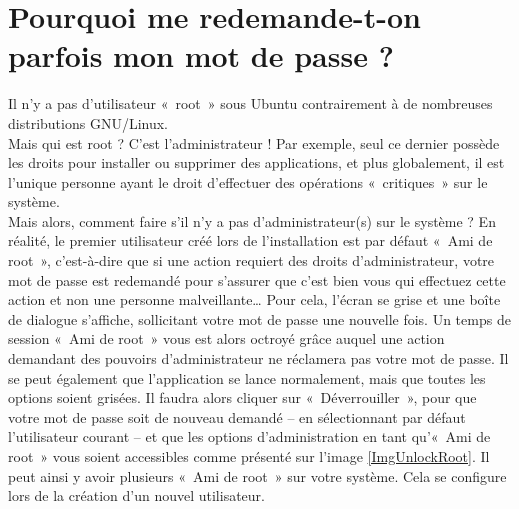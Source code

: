 \section{Pourquoi me redemande-t-on parfois mon mot de passe ?}
\label{RefMdpRoot}
Il n'y a pas d'utilisateur «~root~» sous Ubuntu contrairement à de nombreuses distributions GNU/Linux.\\
Mais qui est root ? C'est l'administrateur ! Par exemple, seul ce dernier possède les droits pour installer ou supprimer des applications, et plus globalement, il est l'unique personne ayant le droit d'effectuer des opérations «~critiques~» sur le système.\\
Mais alors, comment faire s'il n'y a pas d'administrateur(s) sur le système ? En réalité, le premier utilisateur créé lors de l'installation est par défaut «~Ami de root~», c'est-à-dire que si une action requiert des droits d'administrateur, votre mot de passe est redemandé pour s'assurer que c'est bien vous qui effectuez cette action et non une personne malveillante\ldots{} Pour cela, l'écran se grise et une boîte de dialogue s'affiche, sollicitant votre mot de passe une nouvelle fois. Un temps de session «~Ami de root~» vous est alors octroyé grâce auquel une action demandant des pouvoirs d'administrateur ne réclamera pas votre mot de passe. Il se peut également que l'application se lance normalement, mais que toutes les options soient grisées. Il faudra alors cliquer sur «~Déverrouiller~», pour que votre mot de passe soit de nouveau demandé -- en sélectionnant par défaut l'utilisateur courant -- et que les options d'administration en tant qu'«~Ami de root~» vous soient accessibles comme présenté sur l'image \ref{ImgUnlockRoot}. Il peut ainsi y avoir plusieurs «~Ami de root~» sur votre système. Cela se configure lors de la création d'un nouvel utilisateur.
